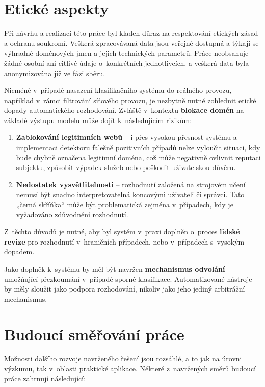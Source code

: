 \section{Etické aspekty}
\label{sec:discussion-ethics}

Při návrhu a realizaci této práce byl kladen důraz na respektování etických zásad a ochranu soukromí. Veškerá zpracovávaná data jsou veřejně dostupná a týkají se výhradně doménových jmen a jejich technických parametrů. Práce neobsahuje žádné osobní ani citlivé údaje o~konkrétních jednotlivcích, a veškerá data byla anonymizována již ve fázi sběru.

Nicméně v~případě nasazení klasifikačního systému do reálného provozu, například v~rámci filtrování síťového provozu, je nezbytně nutné zohlednit etické dopady automatického rozhodování. Zvláště v~kontextu \textbf{blokace domén} na základě výstupu modelu může dojít k~následujícím rizikům:

\begin{enumerate}[label=(\alph*)]
    \item \textbf{Zablokování legitimních webů} – i přes vysokou přesnost systému a implementaci detektoru falešně pozitivních případů nelze vyloučit situaci, kdy bude chybně označena legitimní doména, což může negativně ovlivnit reputaci subjektu, způsobit výpadek služeb nebo poškodit uživatelskou důvěru.
    
    \item \textbf{Nedostatek vysvětlitelnosti} – rozhodnutí založená na strojovém učení nemusí být snadno interpretovatelná koncovými uživateli či správci. Tato „černá skříňka“ může být problematická zejména v~případech, kdy je vyžadováno zdůvodnění rozhodnutí.
\end{enumerate}

Z~těchto důvodů je nutné, aby byl systém v~praxi doplněn o~proces \textbf{lidské revize} pro rozhodnutí v~hraničních případech, nebo v~případech s~vysokým dopadem.

Jako doplněk k~systému by měl být navržen \textbf{mechanismus odvolání} umožňující přezkoumání v~případě sporné klasifikace. Automatizované nástroje by měly sloužit jako podpora rozhodování, nikoliv jako jeho jediný arbitrážní mechanismus.


\section{Budoucí směřování práce}
\label{sec:discussion-future}

Možnosti dalšího rozvoje navrženého řešení jsou rozsáhlé, a to jak na úrovni výzkumu, tak v~oblasti praktické aplikace. Některé z~navržených směrů budoucí práce zahrnují následující:

